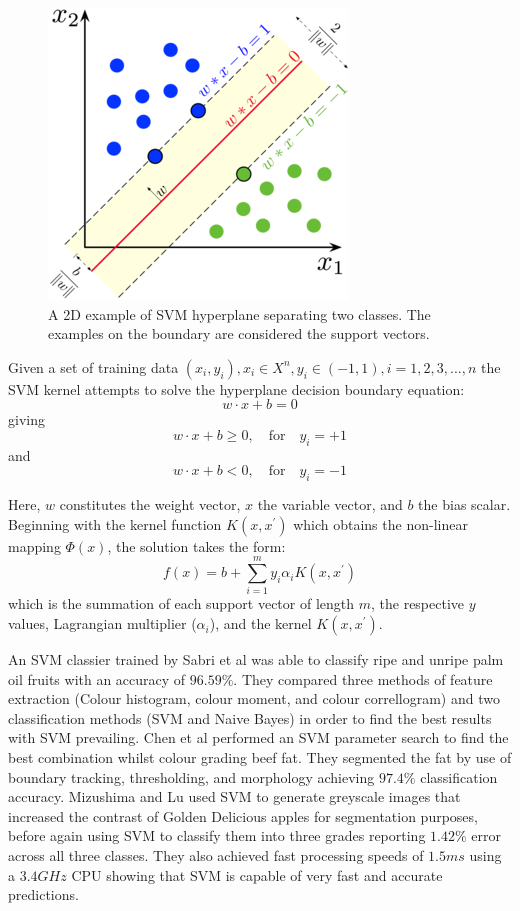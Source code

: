 \documentclass[fleqn,twoside,12pt]{report}
\begin{document}
\begin{figure}[h]
	\centering
	\includegraphics[width=0.5\linewidth]{SVM.png}
	\caption{A 2D example of SVM hyperplane separating two classes. The examples on the boundary are considered the support vectors.}
	\label{fig:SVM}
\end{figure}%

Given a set of training data {$(x_i, y_i), x_i \in X^n, y_i \in (-1,1), i = 1,2,3,...,n$} the SVM kernel attempts to solve the hyperplane decision boundary equation:
\begin{equation}
w \cdot x + b = 0
\end{equation} 
giving
\begin{equation}
w \cdot x + b \geq 0, \quad \textrm{for} \quad y_i = +1
\end{equation}
and
\begin{equation}
w \cdot x + b < 0, \quad \textrm{for} \quad y_i = -1
\end{equation}

Here, $w$ constitutes the weight vector, $x$ the variable vector, and $b$ the bias scalar. Beginning with the kernel function $K(x, x^\prime)$ which obtains the non-linear mapping $\Phi(x)$, the solution takes the form:
\begin{equation}
f(x) = b + \sum_{i=1}^{m} y_i \alpha_i K(x, x^\prime)
\end{equation}
which is the summation of each support vector of length $m$, the respective $y$ values, Lagrangian multiplier ($\alpha_i$), and the kernel $K(x, x^\prime)$.


An SVM classier trained by Sabri et al \cite{sabri} was able to classify ripe and unripe palm oil fruits with an accuracy of $96.59\%$. They compared three methods of feature extraction (Colour histogram, colour moment, and colour correllogram) and two classification methods (SVM and Naive Bayes) in order to find the best results with SVM prevailing. Chen et al \cite{chen} performed an SVM parameter search to find the best combination whilst colour grading beef fat. They segmented the fat by use of boundary tracking, thresholding, and morphology achieving $97.4\%$ classification accuracy. Mizushima and Lu \cite{mizushima} used SVM to generate greyscale images that increased the contrast of Golden Delicious apples for segmentation purposes, before again using SVM to classify them into three grades reporting $1.42\%$ error across all three classes. They also achieved fast processing speeds of $1.5ms$ using a $3.4 GHz$ CPU showing that SVM is capable of very fast and accurate predictions. 
\end{document}
